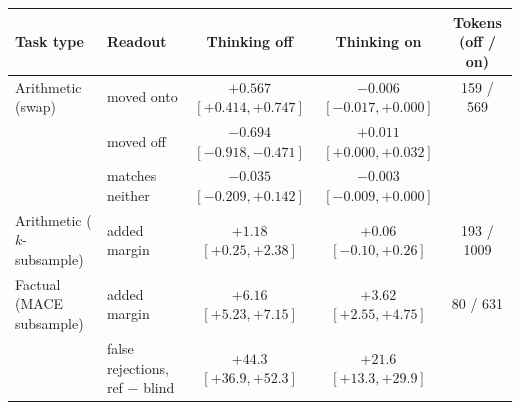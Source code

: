 \begin{tabular}{llccc}
\toprule
Task type & Readout & Thinking off & Thinking on & Tokens (off / on) \\
\midrule
Arithmetic (swap) & moved onto & $+0.567$ {\scriptsize$[+0.414,+0.747]$} & $-0.006$ {\scriptsize$[-0.017,+0.000]$} & 159 / 569 \\
 & moved off & $-0.694$ {\scriptsize$[-0.918,-0.471]$} & $+0.011$ {\scriptsize$[+0.000,+0.032]$} & \\
 & matches neither & $-0.035$ {\scriptsize$[-0.209,+0.142]$} & $-0.003$ {\scriptsize$[-0.009,+0.000]$} & \\
Arithmetic ($k$-subsample) & added margin & $+1.18$ {\scriptsize$[+0.25,+2.38]$} & $+0.06$ {\scriptsize$[-0.10,+0.26]$} & 193 / 1009 \\
Factual (MACE subsample) & added margin & $+6.16$ {\scriptsize$[+5.23,+7.15]$} & $+3.62$ {\scriptsize$[+2.55,+4.75]$} & 80 / 631 \\
 & false rejections, ref $-$ blind & $+44.3$ {\scriptsize$[+36.9,+52.3]$} & $+21.6$ {\scriptsize$[+13.3,+29.9]$} & \\
\bottomrule
\end{tabular}
